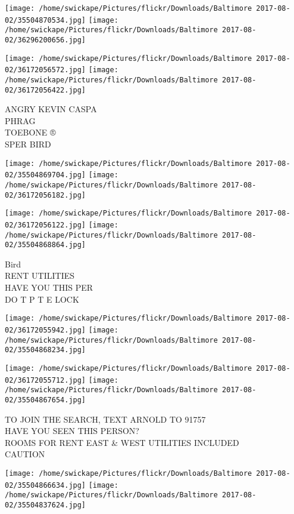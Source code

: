 \documentclass[10pt,letterpaper]{article}
\begin{document}
\texttt{[image: /home/swickape/Pictures/flickr/Downloads/Baltimore 2017-08-02/35504870534.jpg]}
\texttt{[image: /home/swickape/Pictures/flickr/Downloads/Baltimore 2017-08-02/36296200656.jpg]}

\texttt{[image: /home/swickape/Pictures/flickr/Downloads/Baltimore 2017-08-02/36172056572.jpg]}
\texttt{[image: /home/swickape/Pictures/flickr/Downloads/Baltimore 2017-08-02/36172056422.jpg]}

ANGRY KEVIN CASPA\\
PHRAG\\
TOEBONE ®\\
SPER BIRD
\pagebreak

\texttt{[image: /home/swickape/Pictures/flickr/Downloads/Baltimore 2017-08-02/35504869704.jpg]}
\texttt{[image: /home/swickape/Pictures/flickr/Downloads/Baltimore 2017-08-02/36172056182.jpg]}

\texttt{[image: /home/swickape/Pictures/flickr/Downloads/Baltimore 2017-08-02/36172056122.jpg]}
\texttt{[image: /home/swickape/Pictures/flickr/Downloads/Baltimore 2017-08-02/35504868864.jpg]}

Bird\\
RENT UTILITIES\\
HAVE YOU THIS PER\\
DO T P T E LOCK
\pagebreak

\texttt{[image: /home/swickape/Pictures/flickr/Downloads/Baltimore 2017-08-02/36172055942.jpg]}
\texttt{[image: /home/swickape/Pictures/flickr/Downloads/Baltimore 2017-08-02/35504868234.jpg]}

\texttt{[image: /home/swickape/Pictures/flickr/Downloads/Baltimore 2017-08-02/36172055712.jpg]}
\texttt{[image: /home/swickape/Pictures/flickr/Downloads/Baltimore 2017-08-02/35504867654.jpg]}

TO JOIN THE SEARCH, TEXT ARNOLD TO 91757\\
HAVE YOU SEEN THIS PERSON?\\
ROOMS FOR RENT EAST \& WEST UTILITIES INCLUDED\\
CAUTION
\pagebreak

\texttt{[image: /home/swickape/Pictures/flickr/Downloads/Baltimore 2017-08-02/35504866634.jpg]}
\texttt{[image: /home/swickape/Pictures/flickr/Downloads/Baltimore 2017-08-02/35504837624.jpg]}
\end{document}
